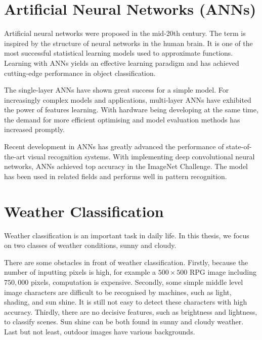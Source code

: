 \section{Artificial Neural Networks (ANNs)}

Artificial neural networks were proposed in the mid-20th century. The term is inspired by the structure of neural networks in the human brain. It is one of the most successful statistical learning models used to approximate functions. Learning with ANNs yields an effective learning paradigm and has achieved cutting-edge performance in object classification. 

The single-layer ANNs  have shown great success for a simple model. For increasingly complex models and applications, multi-layer ANNs have exhibited the power of features learning. With hardware being developing at the same time, the demand for more efficient optimising and model evaluation methods has increased promptly. 

Recent development in ANNs has greatly advanced the performance of state-of-the-art visual recognition systems. With implementing deep convolutional neural networks, ANNs achieved top accuracy in the ImageNet Challenge. The model has been used in related fields and performs well in pattern recognition.

\section{Weather Classification}

Weather classification is an important task in daily life. In this thesis, we focus on two classes of weather conditions, sunny and cloudy. 

There are some obstacles in front of weather classification. Firstly, because the number of inputting pixels is high, for example a $500 \times 500$ RPG image including $750,000$ pixels, computation is expensive. Secondly, some simple middle level image characters are difficult to be recognised by machines, such as light, shading, and sun shine. It is still not easy to detect these characters with high accuracy. Thirdly, there are no decisive features, such as brightness and lightness, to classify scenes. Sun shine can be both found in sunny and cloudy weather. Last but not least, outdoor images have various backgrounds.


